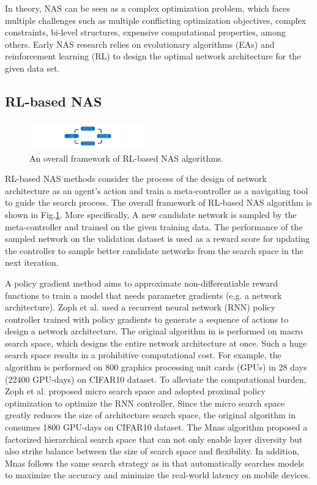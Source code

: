 \documentclass[journal]{IEEEtran}
\begin{document}
In theory, NAS can be seen as a complex optimization problem, which faces multiple challenges such as multiple conflicting optimization objectives, complex constraints, bi-level structures, expensive computational properties, among others. Early NAS research relies on evolutionary algorithms (EAs) and reinforcement learning (RL) to design the optimal network architecture for the given data set.

\subsection{RL-based NAS}

\begin{figure}[H]
\centering %
\includegraphics[width=0.45\textwidth]{1.pdf} %
\caption{An overall framework of RL-based NAS algorithms.} %
\label{Fig_2}
\end{figure}

RL-based NAS methods consider the process of the design of network architecture as an agent’s action and train a meta-controller as a navigating tool to guide the search process. The overall framework of RL-based NAS algorithm is shown in Fig.\ref{Fig_2}. More specifically, A new candidate network is sampled by the meta-controller and trained on the given training data. The performance of the sampled network on the validation dataset is used as a reward score for updating the controller to sample better candidate networks from the search space in the next iteration.

A policy gradient method aims to approximate non-differentiable reward functions to train a model that needs parameter gradients (e.g. a network architecture). Zoph et al. \cite{zoph2016neural} used a recurrent neural network (RNN) policy controller trained with policy gradients to generate a sequence of actions to design a network architecture. The original algorithm in \cite{baker2016designing} is performed on macro search space, which designs the entire network architecture at once. Such a huge search space results in a prohibitive computational cost. For example, the algorithm \cite{baker2016designing} is performed on 800 graphics processing unit cards (GPUs) in 28 days (22400 GPU-days) on CIFAR10 dataset. To alleviate the computational burden, Zoph et al. \cite{zoph2018learning} proposed micro search space and adopted proximal policy optimization to optimize the RNN controller. Since the micro search space greatly reduces the size of architecture search space, the original algorithm in \cite{zoph2018learning} consumes 1800 GPU-days on CIFAR10 dataset. The Mnas algorithm \cite{tan2019mnasnet} proposed a factorized hierarchical search space that can not only enable layer diversity but also strike balance between the size of search space and flexibility. In addition, Mnas follows the same search strategy as in \cite{zoph2018learning} that automatically searches models to maximize the accuracy and minimize the real-world latency on mobile devices.
\end{document}
